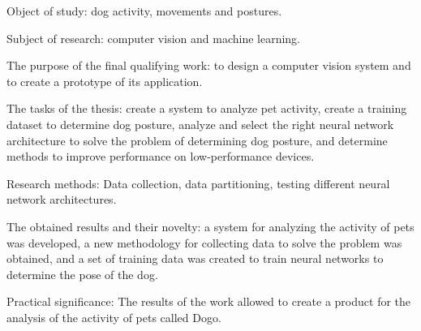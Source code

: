 Object of study: dog activity, movements and postures.

Subject of research: computer vision and machine learning.

The purpose of the final qualifying work: to design a computer vision system and to create a prototype of its application.

The tasks of the thesis: create a system to analyze pet activity, create a training dataset to determine dog posture, analyze and select the right neural network architecture to solve the problem of determining dog posture, and determine methods to improve performance on low-performance devices.

Research methods: Data collection, data partitioning, testing different neural network architectures.

The obtained results and their novelty:  a system for analyzing the activity of pets was developed, a new methodology for collecting data to solve the problem was obtained, and a set of training data was created to train neural networks to determine the pose of the dog. 

Practical significance: The results of the work allowed to create a product for the analysis of the activity of pets called Dogo.






